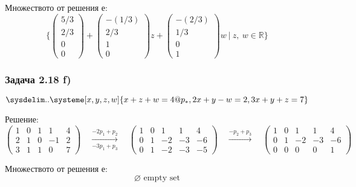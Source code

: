 \documentclass{subfiles}
\begin{document}
\noindent Множеството от решения е:
\begin{equation*}
    \{
        \left(\begin{array}{ c }5 / 3 \\ 2 / 3 \\ 0 \\ 0 \end{array}\right) +
        \left(\begin{array}{ c }-(1 / 3) \\ 2 / 3 \\ 1 \\ 0 \end{array}\right) z +
        \left(\begin{array}{ c }-(2 / 3) \\ 1 / 3 \\ 0 \\ 1 \end{array}\right) w
        \ |\ z,\ w \in \mathbb{R}
    \}
\end{equation*}

\subsubsection{Задача 2.18 f)}

\begin{equation*}
    \sysdelim..\systeme[x,y,z,w]{
        x + z + w = 4@p_{*},
        2x + y - w = 2,
        3x + y + z = 7
    }
\end{equation*}

\noindent Решение:
\begin{equation*}
    \left(
        \begin{array}{ cccc|c }
            1 & 0 & 1 & 1 & 4 \\
            2 & 1 & 0 & -1 & 2 \\
            3 & 1 & 1 & 0 & 7
        \end{array}
    \right)
    \quad
    \overset{-2p_{1}+p_{2}}{\underset{-3p_{1}+p_{3}}{\longrightarrow}}
    \quad
    \left(
        \begin{array}{ cccc|c }
            1 & 0 & 1 & 1 & 4 \\
            0 & 1 & -2 & -3 & -6 \\
            0 & 1 & -2 & -3 & -5
        \end{array}
    \right)
    \quad
    \overset{-p_{2}+p_{3}}{\longrightarrow}
    \quad
    \left(
        \begin{array}{ cccc|c }
            1 & 0 & 1 & 1 & 4 \\
            0 & 1 & -2 & -3 & -6 \\
            0 & 0 & 0 & 0 & 1
        \end{array}
    \right)
\end{equation*}

\noindent Множеството от решения е:
\begin{equation*}\varnothing \text{ empty set}\end{equation*}
\end{document}
